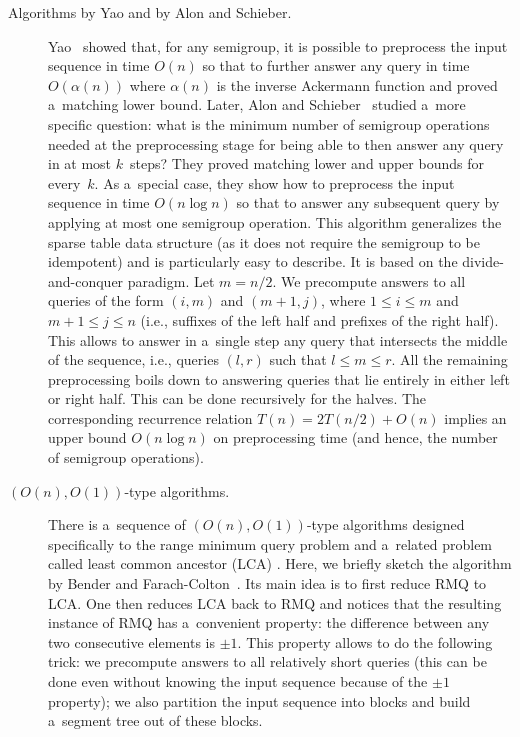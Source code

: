 \documentclass[11pt,letterpaper]{article}
\begin{document}
\begin{description}
\item[Algorithms by Yao and by Alon and Schieber.] Yao~\cite{DBLP:conf/stoc/Yao82} showed that, for any semigroup, it is possible to preprocess the input sequence in time $O(n)$ so that to further answer any query in time $O(\alpha(n))$ where $\alpha(n)$ is the inverse Ackermann function and proved a~matching lower bound. Later, Alon and Schieber~\cite{Alon87optimalpreprocessing} studied a~more specific question: what is the minimum number of semigroup operations needed at the preprocessing stage for being able to then answer any query in at most $k$~steps? They proved matching lower and upper bounds for every~$k$. As a~special case, they show how to preprocess the input sequence in time $O(n\log n)$ so that to answer any subsequent query by applying at most one semigroup operation. This algorithm generalizes the sparse table data structure (as it does not require the semigroup to be idempotent) and is particularly easy to describe. It is based on the divide-and-conquer paradigm. Let $m=n/2$. We precompute answers to all queries of the form $(i,m)$ and $(m+1,j)$, where $1 \le i \le m$ and $m+1 \le j \le n$ (i.e., suffixes of the left half and prefixes of the right half). This allows to answer in a~single step any query that intersects the middle of the sequence, i.e., queries $(l,r)$ such that $l \le m \le r$. All the remaining preprocessing boils down to answering queries that lie entirely in either left or right half. This can be done recursively for the halves. The corresponding recurrence relation $T(n)=2T(n/2)+O(n)$ implies an upper bound $O(n\log n)$ on preprocessing time (and hence, the number of semigroup operations).



\item[$(O(n), O(1))$-type algorithms.]
There is a~sequence of $(O(n), O(1))$-type algorithms designed specifically to the range minimum query problem and a~related problem called least common ancestor (LCA) \cite{}.{} Here, we briefly sketch the algorithm by Bender and Farach-Colton~\cite{DBLP:conf/latin/BenderF00}. 
Its main idea is to first reduce RMQ to LCA. One then reduces LCA back to RMQ and notices that the resulting instance of RMQ has a~convenient property: the difference between any two consecutive elements is $\pm 1$. This property allows to do the following trick: we precompute answers to all relatively short queries (this can be done even without knowing the input sequence because of the $\pm 1$ property); we also partition the input sequence into blocks and build a~segment tree out of these blocks.
\end{description}
\end{document}
